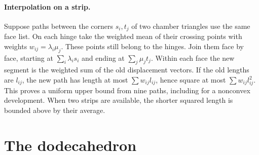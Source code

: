 \documentclass[11pt,letterpaper]{article}
\newcommand{\1}{\mathbf 1}
\begin{document}
\paragraph{Interpolation on a strip.}
Suppose paths between the corners $s_i,t_j$ of two chamber triangles use the same face list. On each hinge take the weighted mean of their crossing points with weights $w_{ij}=\lambda_i\mu_j$. These points still belong to the hinges. Join them face by face, starting at $\sum_i\lambda_i s_i$ and ending at $\sum_j\mu_j t_j$. Within each face the new segment is the weighted sum of the old displacement vectors. If the old lengths are $l_{ij}$, the new path has length at most $\sum w_{ij}l_{ij}$, hence square at most $\sum w_{ij}l_{ij}^2$. This proves a uniform upper bound from nine paths, including for a nonconvex development. When two strips are available, the shorter squared length is bounded above by their average.


\section{The dodecahedron}\label{sec:dod}

\end{document}
